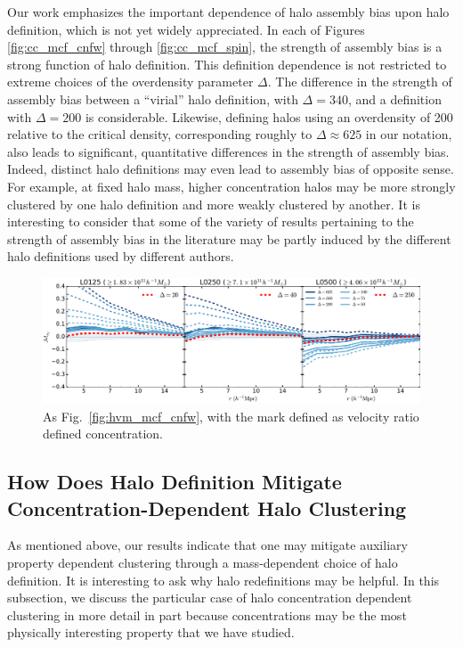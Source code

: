 \documentclass[usenatbib,fleqn]{mnras}
\begin{document}
Our work emphasizes the important dependence of halo assembly bias upon halo definition, which is not yet widely appreciated. In each of Figures \ref{fig:cc_mcf_cnfw} through \ref{fig:cc_mcf_spin}, the strength of assembly bias is a strong function of halo definition. This definition dependence is not restricted to extreme choices of the overdensity parameter $\Delta$. The difference in the strength of assembly bias between a ``virial'' halo definition, with $\Delta=340$, and a definition with $\Delta=200$ is considerable. Likewise, defining halos using an overdensity of 200 relative to the critical density, corresponding roughly to $\Delta \approx 625$ in our notation, also leads to significant, quantitative differences in the strength of assembly bias. Indeed, distinct halo definitions may even lead to assembly bias of opposite sense. For example, at fixed halo mass, higher concentration halos may be more strongly clustered by one halo definition and more weakly clustered by another. It is interesting to consider that some of the variety of results pertaining to the strength of assembly bias in the literature may be partly induced by the different halo definitions used by different authors.

\begin{figure}
	\centering
	\includegraphics[width=\textwidth]{match_mcf_cV.pdf}
	\caption{As Fig.~\ref{fig:hvm_mcf_cnfw}, with the mark defined as velocity ratio defined concentration.
}
	\label{fig:hvm_mcf_cV}
\end{figure}

\subsection{How Does Halo Definition Mitigate Concentration-Dependent Halo Clustering}

As mentioned above, our results indicate that one may mitigate auxiliary 
property dependent clustering through a mass-dependent choice of halo 
definition. It is interesting to ask why halo redefinitions may be 
helpful. In this subsection, we discuss the particular case of halo 
concentration dependent clustering in more detail in part because 
concentrations may be the most physically interesting property that 
we have studied.
\end{document}
